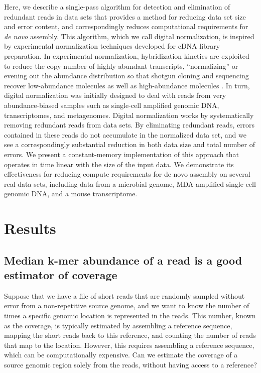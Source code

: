 \documentclass[10pt]{article}
\begin{document}
Here, we describe a single-pass algorithm for detection and
elimination of redundant reads in data sets that provides a method for
reducing data set size and error content, and correspondingly reduces
computational requirements for {\em de novo} assembly.  This algorithm,
which we call digital normalization, is inspired by experimental
normalization techniques developed for cDNA library preparation.  In
experimental normalization, hybridization kinetics are exploited to
reduce the copy number of highly abundant transcripts, ``normalizing''
or evening out the abundance distribution so that shotgun cloning and
sequencing recover low-abundance molecules as well as high-abundance
molecules \cite{pubmed8889548,pubmed7937745}.  In turn, digital
normalization was initially designed to deal with reads from very
abundance-biased samples such as single-cell amplified genomic DNA,
transcriptomes, and metagenomes.  Digital normalization works by
systematically removing redundant reads from data sets.  By
eliminating redundant reads, errors contained in these reads do not
accumulate in the normalized data set, and we see a correspondingly
substantial reduction in both data size and total number of errors.
We present a constant-memory implementation of this approach that
operates in time linear with the size of the input data.  We
demonstrate its effectiveness for reducing compute requirements for de
novo assembly on several real data sets, including data from a
microbial genome, MDA-amplified single-cell genomic DNA, and a mouse
transcriptome.

\section*{Results}

\subsection*{Median k-mer abundance of a read is a good estimator of coverage}

Suppose that we have a file of short reads that are randomly sampled
without error from a non-repetitive source genome, and we want to know
the number of times a specific genomic location is represented in the
reads.  This number, known as the coverage, is typically estimated by
assembling a reference sequence, mapping the short reads back to this
reference, and counting the number of reads that map to the location.
However, this requires assembling a reference sequence, which can be
computationally expensive.  Can we estimate the coverage of a source
genomic region solely from the reads, without having access to a
reference?
\end{document}
